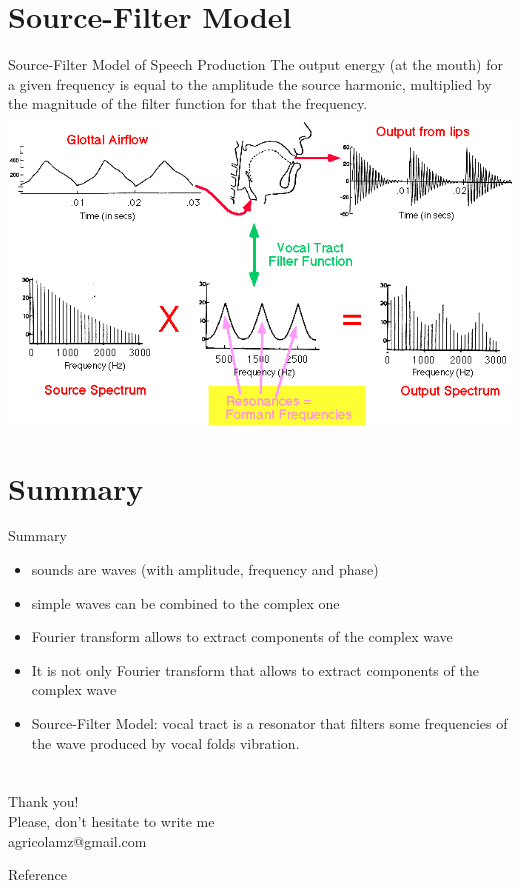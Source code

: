 \section{Source-Filter Model}
\begin{frame}{Source-Filter Model of Speech Production}
The output energy (at the mouth) for a given frequency is equal to the amplitude the source harmonic, multiplied by the magnitude of the filter function for that the frequency.
\includegraphics[width=0.95\linewidth]{22-source-filter.png}
\end{frame}

\section{Summary}
\begin{frame}{Summary}
\begin{itemize}
\item sounds are waves (with amplitude, frequency and phase)
\item simple waves can be combined to the complex one
\item Fourier transform allows to extract components of the complex wave
\item It is not only Fourier transform that allows to extract components of the complex wave
\item Source-Filter Model: vocal tract is a resonator that filters some frequencies of the wave produced by vocal folds vibration.
\end{itemize}
\end{frame}
\section{}

\begin{frame}
{\huge Thank you!\bigskip\\
\normalsize Please, don't hesitate to write me\\
agricolamz@gmail.com
\vspace{-130pt}}
\end{frame}
\begin{frame}{Reference}
\footnotesize


\end{frame}

